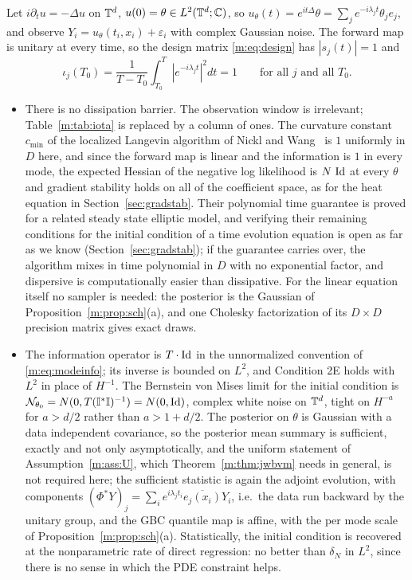 Let $i\partial_tu=-\Delta u$ on $\mathbb{T}^d$, $u(0)=\theta\in L^2(\mathbb{T}^d;\mathbb{C})$, so $u_\theta(t)=e^{it\Delta}\theta=\sum_je^{-i\lambda_jt}\theta_je_j$, and observe $Y_i=u_\theta(t_i,x_i)+\varepsilon_i$ with complex Gaussian noise. The forward map is unitary at every time, so the design matrix \eqref{m:eq:design} has $|s_j(t)|=1$ and
\begin{equation}\label{m:eq:schinfo}
\iota_j(T_0)=\frac1{T-T_0}\int_{T_0}^T|e^{-i\lambda_jt}|^2dt=1\qquad\text{for all }j\text{ and all }T_0 .
\end{equation}
\begin{itemize}[nosep]
\item There is no dissipation barrier. The observation window is irrelevant; Table~\ref{m:tab:iota} is replaced by a column of ones. The curvature constant $c_{\min}$ of the localized Langevin algorithm of Nickl and Wang~\cite{nicklwang2024} is $1$ uniformly in $D$ here, and since the forward map is linear and the information is $1$ in every mode, the expected Hessian of the negative log likelihood is $N\,\operatorname{Id}$ at every $\theta$ and gradient stability holds on all of the coefficient space, as for the heat equation in Section~\ref{sec:gradstab}. Their polynomial time guarantee is proved for a related steady state elliptic model, and verifying their remaining conditions for the initial condition of a time evolution equation is open as far as we know (Section~\ref{sec:gradstab}); if the guarantee carries over, the algorithm mixes in time polynomial in $D$ with no exponential factor, and dispersive is computationally easier than dissipative. For the linear equation itself no sampler is needed: the posterior is the Gaussian of Proposition~\ref{m:prop:sch}(a), and one Cholesky factorization of its $D\times D$ precision matrix gives exact draws.
\item The information operator is $T\cdot\operatorname{Id}$ in the unnormalized convention of \eqref{m:eq:modeinfo}; its inverse is bounded on $L^2$, and Condition 2E holds with $L^2$ in place of $H^{-1}$. The Bernstein von Mises limit for the initial condition is $\mathcal{N}_{\theta_0}=N(0,T(\mathbb{I}^*\mathbb{I})^{-1})=N(0,\operatorname{Id})$, complex white noise on $\mathbb{T}^d$, tight on $H^{-a}$ for $a>d/2$ rather than $a>1+d/2$. The posterior on $\theta$ is Gaussian with a data independent covariance, so the posterior mean summary is sufficient, exactly and not only asymptotically, and the uniform statement of Assumption~\ref{m:ass:U}, which Theorem~\ref{m:thm:jwbvm} needs in general, is not required here; the sufficient statistic is again the adjoint evolution, with components $(\Phi^*Y)_j=\sum_ie^{i\lambda_jt_i}\overline{e_j(x_i)}Y_i$, i.e.\ the data run backward by the unitary group, and the GBC quantile map is affine, with the per mode scale of Proposition~\ref{m:prop:sch}(a). Statistically, the initial condition is recovered at the nonparametric rate of direct regression: no better than $\delta_N$ in $L^2$, since there is no sense in which the PDE constraint helps.

\end{itemize}
